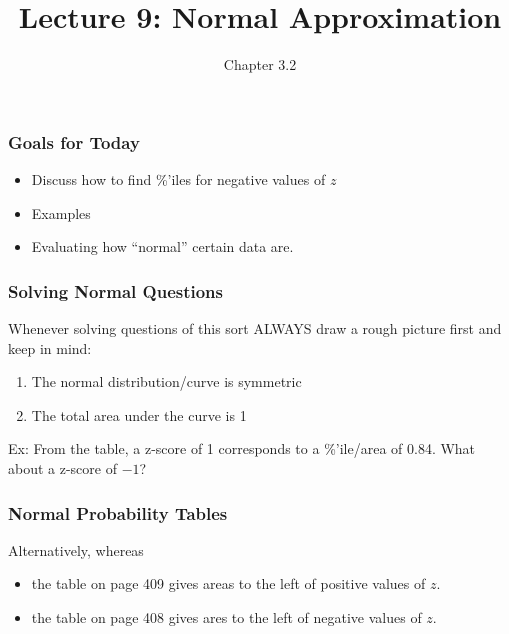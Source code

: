 \documentclass[handout]{beamer}
\title{Lecture 9: Normal Approximation}
\author{Chapter 3.2}
\date{}
\newcommand{\blue}[1]{\textcolor{blue2}{#1}}
\begin{document}
\begin{frame}
\titlepage
\end{frame}


\begin{frame}[fragile]
\frametitle{Goals for Today}

\begin{itemize}
\item Discuss how to find \%'iles for negative values of $z$
\item Examples
\item Evaluating how ``normal'' certain data are.  
\end{itemize}

\end{frame}


\begin{frame}
\frametitle{Solving Normal Questions}
Whenever solving questions of this sort \blue{ALWAYS} draw a rough picture first and keep in mind:
\begin{enumerate}
\item The normal distribution/curve is \blue{symmetric}
\item The total area under the curve is 1
\end{enumerate}

\pause\vspace{0.25cm}

Ex: From the table, a z-score of 1 corresponds to a \%'ile/area of 0.84.  What about a z-score of $-1$?
\vspace{5cm}



\end{frame}


\begin{frame}
\frametitle{Normal Probability Tables}
Alternatively, whereas 
\begin{itemize}
\item the table on page 409 gives areas to the left of positive values of $z$.
\item the table on page 408 gives ares to the left of negative values of $z$.
\end{itemize}

\end{frame}
\end{document}
